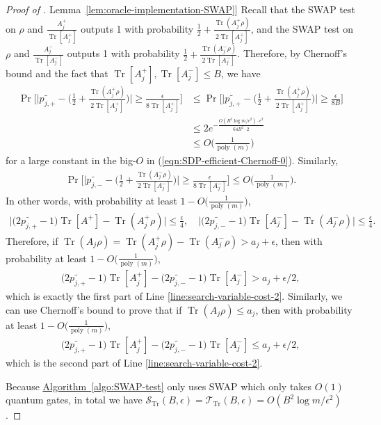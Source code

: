\documentclass[a4paper,UKenglish,cleveref, autoref]{lipics-v2019}
\theoremstyle{remark}
\numberwithin{equation}{section}
\numberwithin{oracle}{section}
\numberwithin{remark}{section}
\newcommand{\eqn}[1]{(\ref{eqn:#1})}
\newcommand{\lem}[1]{\hyperref[lem:#1]{Lemma~\ref*{lem:#1}}}
\newcommand{\algo}[1]{\hyperref[algo:#1]{Algorithm~\ref*{algo:#1}}}
\DeclareMathOperator{\poly}{poly}
\DeclareMathOperator{\tr}{Tr}
\DeclareMathOperator{\Tr}{Tr}
\begin{document}
\begin{proof}[Proof of \lem{oracle-implementation-SWAP}]
Recall that the \textsf{SWAP} test \cite{buhrman2001quantum} on $\rho$ and $\frac{A_{j}^{+}}{\Tr[A_{j}^{+}]}$ outputs 1 with probability $\frac{1}{2}+\frac{ \tr(A_{j}^{+} \rho)}{2\Tr[A_{j}^{+}]}$, and the \textsf{SWAP} test on $\rho$ and $\frac{A_{j}^{-}}{\Tr[A_{j}^{-}]}$ outputs 1 with probability $\frac{1}{2}+\frac{\tr(A_{j}^{-}\rho)}{2\Tr[A_{j}^{-}]}$. Therefore, by Chernoff's bound and the fact that $\Tr[A_{j}^{+}],\Tr[A_{j}^{-}]\leq B$, we have
\begin{align}
\Pr\Big[\Big|\widetilde{p_{j,+}}-\Big(\frac{1}{2}+\frac{\tr(A_{j}^{+}\rho)}{2\Tr[A_{j}^{+}]}\Big)\Big|\geq\frac{\epsilon}{8\Tr[A_{j}^{+}]}\Big]&\leq \Pr\Big[\Big|\widetilde{p_{j,+}}-\Big(\frac{1}{2}+\frac{ \tr(A_{j}^{+} \rho)}{2\Tr[A_{j}^{+}]}\Big)\Big|\geq\frac{\epsilon}{8B}\Big] \\
&\leq 2e^{-\frac{O(B^{2}\log m/\epsilon^{2})\cdot\epsilon^{2}}{64B^{2}\cdot 2}} \label{eqn:SDP-efficient-Chernoff-0} \\
&\leq O\Big(\frac{1}{\poly(m)}\Big)\label{eqn:SDP-efficient-Chernoff-1}
\end{align}
for a large constant in the big-$O$ in \eqn{SDP-efficient-Chernoff-0}. Similarly,
\begin{align}
\Pr\Big[\Big|\widetilde{p_{j,-}}-\Big(\frac{1}{2}+\frac{ \tr(A_{j}^{-} \rho)}{2\Tr[A_{j}^{-}]}\Big)\Big|\geq\frac{\epsilon}{8\Tr[A_{j}^{-}]}\Big]\leq O\Big(\frac{1}{\poly(m)}\Big).\label{eqn:SDP-efficient-Chernoff-2}
\end{align}
In other words, with probability at least $1-O\big(\frac{1}{\poly(m)}\big)$,
\begin{align}
\big|\big(2\widetilde{p_{j,+}}-1\big)\Tr[A_{}^{+}]- \tr(A_{j}^{+} \rho) \big|\leq\frac{\epsilon}{4},\quad \big|\big(2\widetilde{p_{j,-}}-1\big)\Tr[A_{j}^{-}]- \tr(A_{j}^{-}  \rho) \big|\leq\frac{\epsilon}{4}.
\end{align}
Therefore, if $\tr(A_{j} \rho)=\tr(A_{j}^{+} \rho)- \tr(A_{j}^{-} \rho)>a_{j}+\epsilon$, then with probability at least $1-O\big(\frac{1}{\poly(m)}\big)$,
\begin{align}
\big(2\widetilde{p_{j,+}}-1\big)\Tr[A_{j}^{+}]-\big(2\widetilde{p_{j,-}}-1\big)\Tr[A_{j}^{-}]>a_{j}+\epsilon/2,
\end{align}
which is exactly the first part of Line \ref{line:search-variable-cost-2}. Similarly, we can use Chernoff's bound to prove that if $\tr(A_{j} \rho)\leq a_{j}$, then with probability at least $1-O\big(\frac{1}{\poly(m)}\big)$,
\begin{align}
\big(2\widetilde{p_{j,+}}-1\big)\Tr[A_{j}^{+}]-\big(2\widetilde{p_{j,-}}-1\big)\Tr[A_{j}^{-}]\leq a_{j}+\epsilon/2,
\end{align}
which is the second part of Line \ref{line:search-variable-cost-2}.

Because \algo{SWAP-test} only uses \textsf{SWAP} which only takes $O(1)$ quantum gates, in total we have $\mathcal{S}_{\tr}(B,\epsilon)=\mathcal{T}_{\tr}(B,\epsilon)=O(B^{2}\log m/\epsilon^{2})$.
\end{proof}
\end{document}
